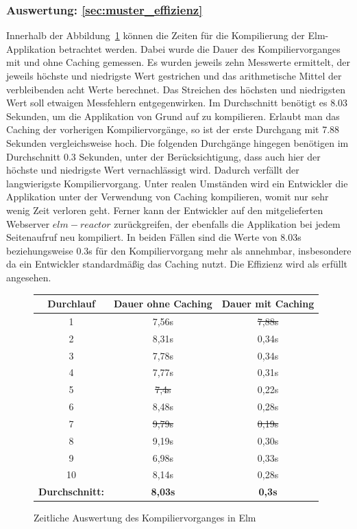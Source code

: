\subsubsection{Auswertung: \ref{sec:muster_effizienz} }
Innerhalb der Abbildung~\ref{fig:compiler-times} können die Zeiten für die Kompilierung der Elm-Applikation betrachtet werden. Dabei wurde die Dauer des Kompiliervorganges mit und ohne Caching gemessen. Es wurden jeweils zehn Messwerte ermittelt, der jeweils höchste und niedrigste Wert gestrichen und das arithmetische Mittel der verbleibenden acht Werte berechnet. Das Streichen des höchsten und niedrigsten Wert soll etwaigen Messfehlern entgegenwirken. Im Durchschnitt benötigt es 8.03 Sekunden, um die Applikation von Grund auf zu kompilieren. Erlaubt man das Caching der vorherigen Kompiliervorgänge, so ist der erste Durchgang mit 7.88 Sekunden vergleichsweise hoch. Die folgenden Durchgänge hingegen benötigen im Durchschnitt 0.3 Sekunden, unter der Berücksichtigung, dass auch hier der höchste und niedrigste Wert vernachlässigt wird. Dadurch verfällt der langwierigste Kompiliervorgang. Unter realen Umständen wird ein Entwickler die Applikation unter der Verwendung von Caching kompilieren, womit nur sehr wenig Zeit verloren geht. Ferner kann der Entwickler auf den mitgelieferten Webserver $elm-reactor$ zurückgreifen, der ebenfalls die Applikation bei jedem Seitenaufruf neu kompiliert. In beiden Fällen sind die Werte von 8.03s beziehungsweise 0.3s für den Kompiliervorgang mehr als annehmbar, insbesondere da ein Entwickler standardmäßig das Caching nutzt. Die Effizienz wird als erfüllt angesehen.
\begin{figure}[h]
\centering
\begin{tabular}{ | c | c | c |}
	\hline
	 \textbf{Durchlauf} 				& \textbf{Dauer ohne Caching} 	& \textbf{Dauer mit Caching}\\
	 \hline
	 1 & 7,56s & \st{7,88s} \\
	 \hline
	 2 & 8,31s & 0,34s\\
	 \hline
	 3 & 7,78s & 0,34s\\
	 \hline
	 4 & 7,77s & 0,31s\\
	 \hline
	 5 & \st{7,4s}& 0,22s\\
	 \hline
	 6 & 8,48s & 0,28s\\
	 \hline
	 7 & \st{9,79s} & \st{0,19s}\\
	 \hline
	 8 & 9,19s & 0,30s\\
	 \hline
	 9 & 6,98s & 0,33s\\
	 \hline
	 10 & 8,14s & 0,28s\\
	 \hhline{|=|=|=|}
	 \textbf{Durchschnitt:} & \textbf{8,03s} & \textbf{0,3s}\\
	 \hline
\end{tabular}
\caption{Zeitliche Auswertung des Kompiliervorganges in Elm}\label{fig:compiler-times}
\end{figure}
